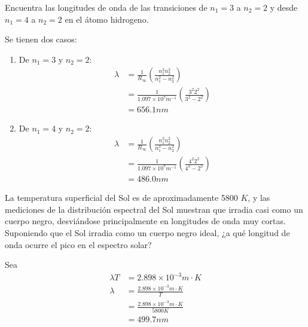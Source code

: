 \begin{problema}
    [Problema 7]  Encuentra las longitudes de onda de las transiciones de $n_{1}=3$ a $n_{2}=2$ y desde $n_{1}=4$ a $n_{2}=2$ en el átomo hidrogeno.
    \begin{sol}
            Se tienen dos casos: 
            \begin{enumerate}
                \item De $n_1=3$ y $n_2=2$:
                \begin{align*}
                    \lambda &= \frac{1}{R_\infty}\left(\frac{n_1^2n_2^2}{n_1^2-n_2^2}\right)\\
                    &= \frac{1}{1.097\times 10^7 m^{-1}}\left(\frac{3^2 2^2}{3^2-2^2}\right)\\
                    &= 656.1 nm
                \end{align*}
                \item De $n_1=4$ y $n_2=2$:
                \begin{align*}
                    \lambda &= \frac{1}{R_\infty}\left(\frac{n_1^2n_2^2}{n_1^2-n_2^2}\right)\\
                    &= \frac{1}{1.097\times 10^7 m^{-1}}\left(\frac{4^2 2^2}{4^2-2^2}\right)\\
                    &= 486.0 nm
                \end{align*}
            \end{enumerate}
    \end{sol}
\end{problema}
\begin{problema}
    [Problema 8]  La temperatura superficial del Sol es de aproximadamente 5800 $K$, y las mediciones de la distribución espectral del Sol muestran que irradia casi como un cuerpo negro, desviándose principalmente en longitudes de onda muy cortas. Suponiendo que el Sol irradia como un cuerpo negro ideal, ¿a qué longitud de onda ocurre el pico en el espectro solar?
    \begin{sol}
        Sea 
        \begin{align*}
            \lambda T &= 2.898\times 10^{-3} m\cdot K\\
            \lambda &= \frac{2.898\times 10^{-3} m\cdot K}{T}\\
            &= \frac{2.898\times 10^{-3} m\cdot K}{5800 K}\\
            &= 499.7 nm
        \end{align*}
    \end{sol}
\end{problema}
